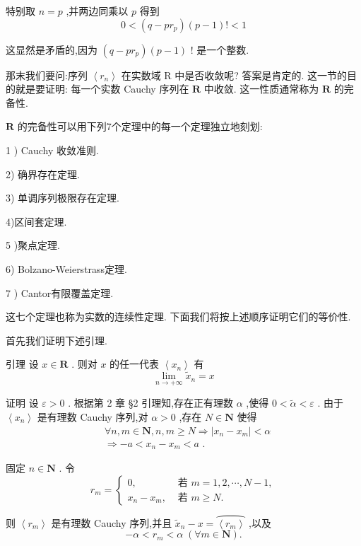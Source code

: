 特别取 $n = p$ ,并两边同乘以 $p$ 得到
$$0 < \left( {q - p{r}_{p}}\right) \left( {p - 1}\right) ! < 1$$

这显然是矛盾的,因为 $\left( {q - p{r}_{p}}\right) \left( {p - 1}\right)$ ! 是一个整数.

那末我们要问:序列 $\left\langle  {r}_{n}\right\rangle$ 在实数域 $\mathrm{R}$ 中是否收敛呢? 答案是肯定的. 这一节的目的就是要证明: 每一个实数 Cauchy 序列在 $\mathbf{R}$ 中收敛. 这一性质通常称为 $\mathbf{R}$ 的完备性.

$\mathbf{R}$ 的完备性可以用下列7个定理中的每一个定理独立地刻划:

1 ) Cauchy 收敛准则.

2) 确界存在定理.

3) 单调序列极限存在定理.

4)区间套定理.

5 )聚点定理.

6) Bolzano-Weierstrass定理.

7 ) Cantor有限覆盖定理.

这七个定理也称为实数的连续性定理. 下面我们将按上述顺序证明它们的等价性.

首先我们证明下述引理.

引理 设 $x \in  \mathbf{R}$ . 则对 $x$ 的任一代表 $\left\langle  {x}_{n}\right\rangle$ 有
$$\mathop{\lim }\limits_{{n \rightarrow   + \infty }}{\widetilde{x}}_{n} = x$$

证明 设 $\varepsilon  > 0$ . 根据第 2 章 §2 引理知,存在正有理数 $\alpha$ ,使得 $0 < \widetilde{\alpha } < \varepsilon$ . 由于 $\left\langle  {x}_{n}\right\rangle$ 是有理数 Cauchy 序列,对 $\alpha  > 0$ ,存在 $N \in  \mathbf{N}$ 使得
\begin{align*}
	&\forall n,m \in  \mathbf{N},n,m \geq  N \Rightarrow  \left| {{x}_{n} - {x}_{m}}\right|  < \alpha\\
	&\Rightarrow   - a < {x}_{n} - {x}_{m} < a\text{ . }
\end{align*}

固定 $n \in  \mathbf{N}$ . 令
$${r}_{m} = \left\{  \begin{array}{ll} 0, & \text{ 若 }m = 1,2,\cdots ,N - 1, \\  {x}_{n} - {x}_{m}, & \text{ 若 }m \geq  N. \end{array}\right.$$

则 $\left\langle  {r}_{m}\right\rangle$ 是有理数 Cauchy 序列,并且 ${\widetilde{x}}_{n} - x = \overset{⏜}{\left\langle  {r}_{m}\right\rangle  }$ ,以及
$$- \alpha  < {r}_{m} < \alpha \;\left( {\forall m \in  \mathbf{N}}\right) .$$

